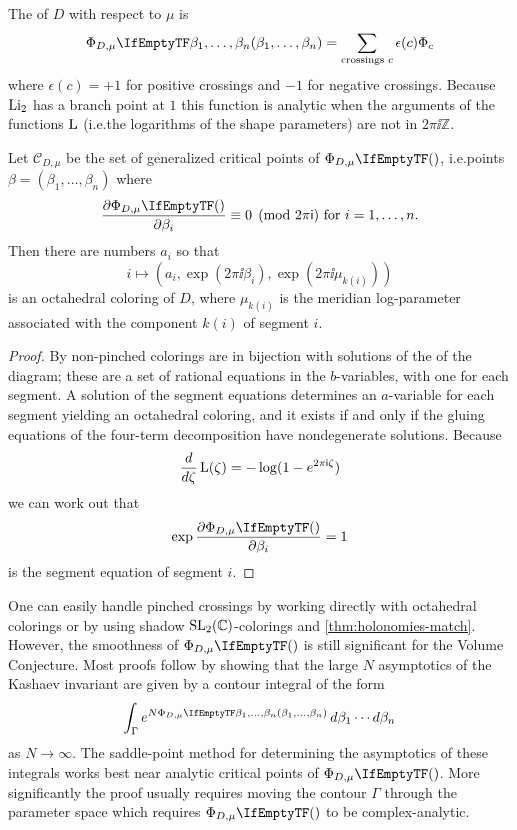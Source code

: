 \documentclass[leqno]{sl2art}
\begin{document}
\begin{definition}
  The  of \(D\) with respect to \(\mu\) is
  \begin{equation}
    \label{eq:potential-function}
    \potl[D, \mu]{\beta_1, \dots, \beta_n}
    =     
    \sum_{\text{crossings } c}
    \epsilon(c) \Phi_c
  \end{equation}
  where \(\epsilon(c) = +1\) for positive crossings and \(-1\) for negative crossings.
  Because \(\operatorname{Li_2}\) has a branch point at \(1\) this function is analytic when the arguments of the functions \(\operatorname{L}\) (i.e.\@ the logarithms of the shape parameters) are not in \(2\pi \ii \mathbb{Z}\).
\end{definition}

\begin{theorem}
  \label{thm:critical-points-are-reps}
  Let \(\mathcal{C}_{D, \mu}\) be the set of generalized critical points of \(\potl[D, \mu]{}\), i.e.\@ points \(\beta = (\beta_1, \dots, \beta_n)\) where
  \[
      \frac{
        \partial \potl[D, \mu]{}
      }{
        \partial \beta_i
      }
      \equiv
      0
      \pmod{2\pi \ii}
      \text{ for }
      i = 1, \dots, n.
  \]
  Then there are numbers \(a_i\) so that
  \[
    i \mapsto (a_i, \exp(2\pi \ii \beta_i), \exp(2\pi \ii \mu_{k(i)}) )
  \]
  is an octahedral coloring of \(D\), where \(\mu_{k(i)}\) is the meridian log-parameter associated with the component \(k(i)\) of segment \(i\).
\end{theorem}

\begin{proof}
  By \cite[Theorem 6.3]{McPhailSnyder2022} non-pinched colorings are in bijection with solutions of the  of the diagram;
  these are a set of rational equations in the \(b\)-variables, with one for each segment.
  A solution of the segment equations determines an \(a\)-variable for each segment yielding an octahedral coloring, and it exists if and only if the gluing equations of the four-term decomposition have nondegenerate solutions.
  Because 
  \[
    \frac{
      d
      }{
      d\zeta
    }
    \operatorname{L}(\zeta)
    =
    -
    \log(1 - e^{2\pi \mathsf{i} \zeta})
  \]
  we can work out that
  \[
    \exp
    \frac{
      \partial \potl[D, \mu]{}
      }{
      \partial \beta_i
    }
    =
    1
  \]
  is the segment equation of segment \(i\).
\end{proof}

One can easily handle pinched crossings by working directly with octahedral colorings or by using shadow \(\operatorname{SL}_2(\mathbb{C})\)-colorings and \cref{thm:holonomies-match}.
However, the smoothness of \(\potl[D, \mu]{}\) is still significant for the Volume Conjecture.
Most proofs follow \textcite{Yokota2000} by showing that the large \(N\) asymptotics of the Kashaev invariant are given by a contour integral of the form
\[
  \int_{\Gamma} e^{N \potl[D, \mu]{\beta_1, \dots, \beta_n}} \,d\beta_1 \cdots d\beta_n
\]
as \(N \to \infty\).
The saddle-point method for determining the asymptotics of these integrals works best near analytic critical points of \(\potl[D,\mu]{}\).
More significantly the proof usually requires moving the contour \(\Gamma\) through the parameter space which requires \(\potl[D, \mu]{}\) to be complex-analytic.
\end{document}
